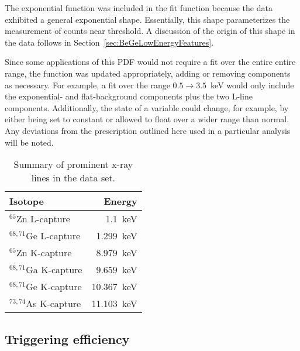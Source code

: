 The exponential function was included in the fit function because the data exhibited a general exponential shape.  Essentially, this shape parameterizes the measurement of counts near threshold.  A discussion of the origin of this shape in the data follows in Section~\ref{sec:BeGeLowEnergyFeatures}.  

Since some applications of this PDF would not require a fit over the entire entire range, the function was updated appropriately, adding or removing components as necessary.  For example, a fit over the range $0.5\to3.5$~keV would only include the exponential- and flat-background components plus the two L-line components.  Additionally, the state of a variable could change, for example, by either being set to constant or allowed to float over a wider range than normal.  Any deviations from the prescription outlined here used in a particular analysis will be noted.  

			\begin{table}
			\centering
				\begin{tabular}{l r}
					\toprule
					Isotope & Energy \\
					\midrule
					$^{65}$Zn L-capture & 1.1~keV \\
					$^{68,71}$Ge L-capture & 1.299~keV \\
					$^{65}$Zn K-capture & 8.979~keV \\
					$^{68,71}$Ga K-capture & 9.659~keV \\
					$^{68,71}$Ge K-capture & 10.367~keV \\
					$^{73,74}$As K-capture & 11.103~keV \\
					\bottomrule
				\end{tabular}	
				\caption[Summary of prominent x-ray lines in the BeGe data set]
				{Summary of prominent x-ray lines in the data set.}
				\label{tab:XRayLines}
			\end{table}	
	
		\subsection{Triggering efficiency}
		\label{sec:BeGeTrigEff}

